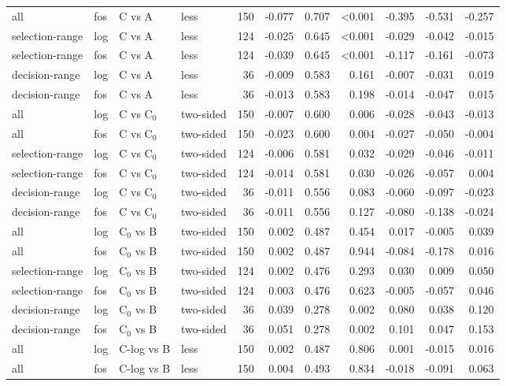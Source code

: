 \begin{longtable}{llllrrrrrrr}
all & fos & C vs A & less & 150 & -0.077 & 0.707 & <0.001 & -0.395 & -0.531 & -0.257 \\
selection-range & log & C vs A & less & 124 & -0.025 & 0.645 & <0.001 & -0.029 & -0.042 & -0.015 \\
selection-range & fos & C vs A & less & 124 & -0.039 & 0.645 & <0.001 & -0.117 & -0.161 & -0.073 \\
decision-range & log & C vs A & less & 36 & -0.009 & 0.583 & 0.161 & -0.007 & -0.031 & 0.019 \\
decision-range & fos & C vs A & less & 36 & -0.013 & 0.583 & 0.198 & -0.014 & -0.047 & 0.015 \\
all & log & C vs C$_0$ & two-sided & 150 & -0.007 & 0.600 & 0.006 & -0.028 & -0.043 & -0.013 \\
all & fos & C vs C$_0$ & two-sided & 150 & -0.023 & 0.600 & 0.004 & -0.027 & -0.050 & -0.004 \\
selection-range & log & C vs C$_0$ & two-sided & 124 & -0.006 & 0.581 & 0.032 & -0.029 & -0.046 & -0.011 \\
selection-range & fos & C vs C$_0$ & two-sided & 124 & -0.014 & 0.581 & 0.030 & -0.026 & -0.057 & 0.004 \\
decision-range & log & C vs C$_0$ & two-sided & 36 & -0.011 & 0.556 & 0.083 & -0.060 & -0.097 & -0.023 \\
decision-range & fos & C vs C$_0$ & two-sided & 36 & -0.011 & 0.556 & 0.127 & -0.080 & -0.138 & -0.024 \\
all & log & C$_0$ vs B & two-sided & 150 & 0.002 & 0.487 & 0.454 & 0.017 & -0.005 & 0.039 \\
all & fos & C$_0$ vs B & two-sided & 150 & 0.002 & 0.487 & 0.944 & -0.084 & -0.178 & 0.016 \\
selection-range & log & C$_0$ vs B & two-sided & 124 & 0.002 & 0.476 & 0.293 & 0.030 & 0.009 & 0.050 \\
selection-range & fos & C$_0$ vs B & two-sided & 124 & 0.003 & 0.476 & 0.623 & -0.005 & -0.057 & 0.046 \\
decision-range & log & C$_0$ vs B & two-sided & 36 & 0.039 & 0.278 & 0.002 & 0.080 & 0.038 & 0.120 \\
decision-range & fos & C$_0$ vs B & two-sided & 36 & 0.051 & 0.278 & 0.002 & 0.101 & 0.047 & 0.153 \\
all & log & C-log vs B & less & 150 & 0.002 & 0.487 & 0.806 & 0.001 & -0.015 & 0.016 \\
all & fos & C-log vs B & less & 150 & 0.004 & 0.493 & 0.834 & -0.018 & -0.091 & 0.063 \\

\end{longtable}
